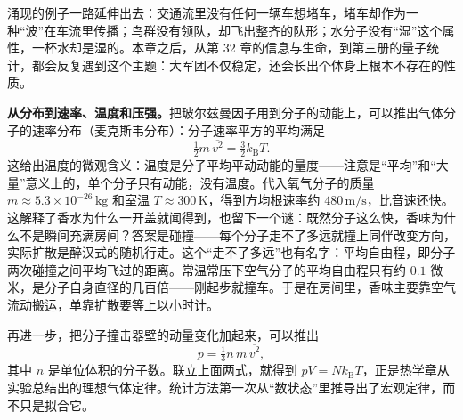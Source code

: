 \begin{center}
\end{center}

涌现的例子一路延伸出去：交通流里没有任何一辆车想堵车，堵车却作为一种“波”在车流里传播；鸟群没有领队，却飞出整齐的队形；水分子没有“湿”这个属性，一杯水却是湿的。本章之后，从第 32 章的信息与生命，到第三册的量子统计，都会反复遇到这个主题：大军团不仅稳定，还会长出个体身上根本不存在的性质。

\begin{mathbridge}
\textbf{从分布到速率、温度和压强。}把玻尔兹曼因子用到分子的动能上，可以推出气体分子的速率分布（麦克斯韦分布）：分子速率平方的平均满足
\[
\tfrac12 m\,\overline{v^2} = \tfrac32 k_{\mathrm B} T .
\]
这给出温度的微观含义：温度是分子平均平动动能的量度——注意是“平均”和“大量”意义上的，单个分子只有动能，没有温度。代入氧气分子的质量 \(m\approx5.3\times10^{-26}\,\mathrm{kg}\) 和室温 \(T\approx300\,\mathrm{K}\)，得到方均根速率约 \(480\,\mathrm{m/s}\)，比音速还快。这解释了香水为什么一开盖就闻得到，也留下一个谜：既然分子这么快，香味为什么不是瞬间充满房间？答案是碰撞——每个分子走不了多远就撞上同伴改变方向，实际扩散是醉汉式的随机行走。这个“走不了多远”也有名字：平均自由程，即分子两次碰撞之间平均飞过的距离。常温常压下空气分子的平均自由程只有约 \(0.1\) 微米，是分子自身直径的几百倍——刚起步就撞车。于是在房间里，香味主要靠空气流动搬运，单靠扩散要等上以小时计。

再进一步，把分子撞击器壁的动量变化加起来，可以推出
\[
p = \tfrac13 n\, m\,\overline{v^2},
\]
其中 \(n\) 是单位体积的分子数。联立上面两式，就得到 \(pV = N k_{\mathrm B}T\)，正是热学章从实验总结出的理想气体定律。统计方法第一次从“数状态”里推导出了宏观定律，而不只是拟合它。
\end{mathbridge}

